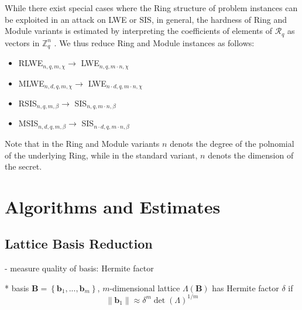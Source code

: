\documentclass[
  a4paper,  %
  twoside,  %
  bibliography=totoc,
  headsepline,
  cleardoublepage=empty,
  parskip=half,
  draft=false
]{scrbook}
\begin{document}

While there exist special cases where the Ring structure of problem instances can be exploited in an attack on LWE or SIS, %
in general, the hardness of Ring and Module variants is estimated by interpreting the coefficients of elements of $\mathcal{R}_q$ as vectors in $\mathbb{Z}_q^n$ \cite{ACDDPPVW18}.
We thus reduce Ring and Module instances as follows:
\begin{itemize}
  \item RLWE$_{n, q, m, \chi} \longrightarrow$ LWE$_{n, q, m \cdot n, \chi}$
  \item MLWE$_{n, d, q, m, \chi} \longrightarrow$ LWE$_{n \cdot d, q, m \cdot n, \chi}$
  \item RSIS$_{n, q, m, \beta} \longrightarrow$ SIS$_{n, q, m \cdot n, \beta}$
  \item MSIS$_{n, d, q, m, \beta} \longrightarrow$ SIS$_{n \cdot d, q, m \cdot n, \beta}$
\end{itemize}
Note that in the Ring and Module variants $n$ denots the degree of the polnomial of the underlying Ring, %
while in the standard variant, $n$ denots the dimension of the secret. 
  
  







\chapter{Algorithms and Estimates}


\section{Lattice Basis Reduction} %
- measure quality of basis: Hermite factor  %

  * basis $\textbf{B} = \left\{\textbf{b}_1, ..., \textbf{b}_m\right\}$, $m$-dimensional lattice $\Lambda(\textbf{B})$ has Hermite factor $\delta$ if
  \begin{equation} \label{eq:hermite}
    \| \textbf{b}_1 \| \approx \delta^m \det(\Lambda)^{1/m}
  \end{equation}
\end{document}
